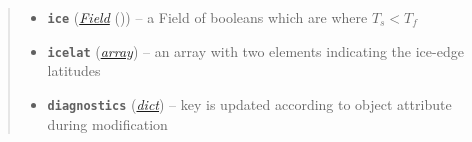 \documentclass[a4paper,10pt,english]{sphinxmanual}
\begin{document}
\begin{fulllineitems}
\begin{fulllineitems}
\begin{quote}
\begin{description}
\begin{itemize}
\item {} 
\textbf{\texttt{ice}} ({\hyperref[api/climlab.domain:climlab.domain.field.Field]{\emph{\emph{Field}}}} ()) -- a Field of booleans which are  where
\(T_s < T_f\)

\item {} 
\textbf{\texttt{icelat}} (\href{http://docs.python.org/2.7/library/array.html\#module-array}{\emph{array}}) -- an array with two elements indicating the 
ice-edge latitudes

\item {} 
\textbf{\texttt{diagnostics}} (\href{http://docs.python.org/2.7/library/stdtypes.html\#dict}{\emph{dict}}) -- key  is updated according to object
attribute  during modification

\end{itemize}

\end{description}\end{quote}

\end{fulllineitems}


\end{fulllineitems}

\end{document}
